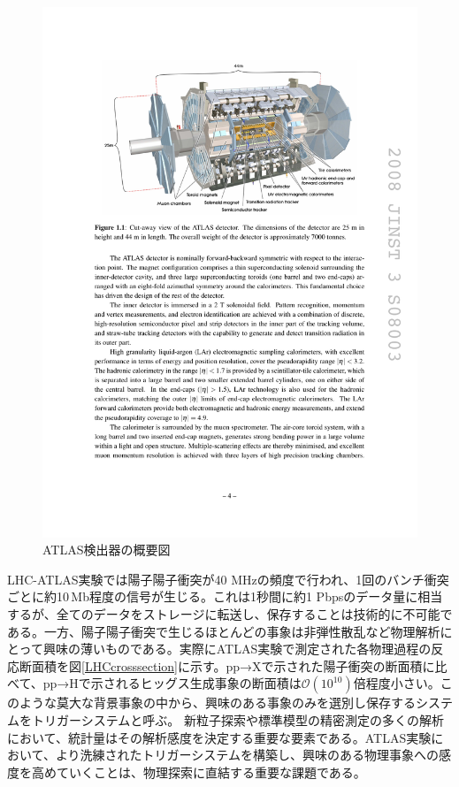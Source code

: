 \begin{figure} 
    \centering
    \includegraphics[width=16cm]{fig/Intro/ATLASdetector.pdf}
    \caption[ATLAS検出器の概要]{ATLAS検出器の概要図\cite{JINST:2008}}
    \label{ATLASdetector}
\end{figure}

LHC-ATLAS実験では陽子陽子衝突が40 MHzの頻度で行われ、1回のバンチ衝突ごとに約10\,Mb程度の信号が生じる。これは1秒間に約1 Pbpsのデータ量に相当するが、全てのデータをストレージに転送し、保存することは技術的に不可能である。一方、陽子陽子衝突で生じるほとんどの事象は非弾性散乱など物理解析にとって興味の薄いものである。実際にATLAS実験で測定された各物理過程の反応断面積を図\ref{LHCcrosssection}に示す。pp→Xで示された陽子衝突の断面積に比べて、pp→Hで示されるヒッグス生成事象の断面積は{$\mathcal{O}(10^{10})$}倍程度小さい。このような莫大な背景事象の中から、興味のある事象のみを選別し保存するシステムをトリガーシステムと呼ぶ。
新粒子探索や標準模型の精密測定の多くの解析において、統計量はその解析感度を決定する重要な要素である。ATLAS実験において、より洗練されたトリガーシステムを構築し、興味のある物理事象への感度を高めていくことは、物理探索に直結する重要な課題である。\par

